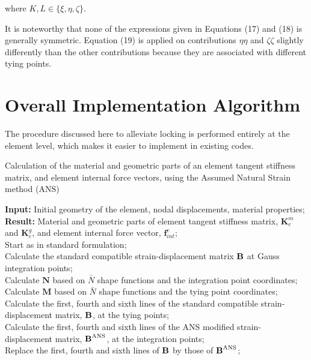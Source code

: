 \documentclass[12pt]{article}
\begin{document}
\noindent
where $K,L \in \{\xi,\eta,\zeta \}$.

It is noteworthy that none of the expressions given in Equations (17) and (18) is generally symmetric. Equation (19) is applied on contributions $\eta \eta$ and $\zeta \zeta$ slightly differently than the other contributions because they are associated with different tying points.


\section{Overall Implementation Algorithm}

The procedure discussed here to alleviate locking is performed entirely at the element level, which makes it easier to implement in existing codes.

\begin{algorithm}
\caption{Calculation of the material and geometric parts of an element tangent stiffness matrix, and element internal force vectors, using the Assumed Natural Strain method (ANS)}\label{alg:cap}
\LinesNumbered
\textbf{Input:} Initial geometry of the element, nodal displacements, material properties;\\
\textbf{Result:} Material and geometric parts of element tangent stiffness matrix, $\boldsymbol{K}^m_e$ and $\boldsymbol{K}^g_e$, and element internal force vector, $\boldsymbol{f}_{int}^e$;\\
{
	Start as in standard formulation;\\
	Calculate the standard compatible strain-displacement matrix $\text{\bf{B}}$ at Gauss integration points;\\
	{
	Calculate $\boldsymbol{N}$ based on $\bar{N}$ shape functions and the integration point coordinates;\\
	Calculate $\boldsymbol{M}$ based on $\bar{N}$ shape functions and the tying point coordinates;\\
	Calculate the first, fourth and sixth lines of the standard compatible strain-displacement matrix, $\text{\bf{B}}$, at the tying points;\\


	}
	Calculate the first, fourth and sixth lines of the ANS modified strain-displacement matrix, $\text{\bf{B}}^{\text{ANS}}$, at the integration points;\\
	Replace the first, fourth and sixth lines of $\text{\bf{B}}$ by those of $\text{\bf{B}}^{\text{ANS}}$;\\

}
\end{algorithm}
\end{document}
